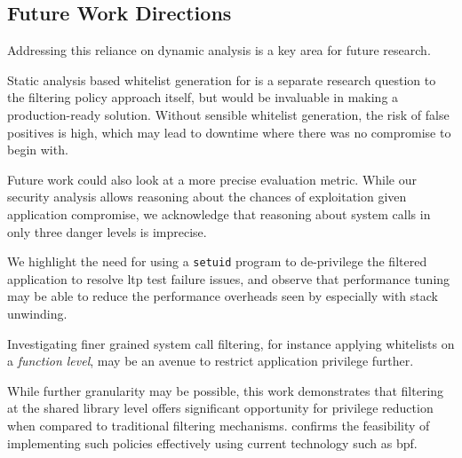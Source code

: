 \subsection{Future Work Directions}

Addressing this reliance on dynamic analysis is a key area for future research.

Static analysis based whitelist generation for \af is a separate research
question to the filtering policy approach itself, but would be invaluable in
making \af a production-ready solution. Without sensible whitelist generation,
the risk of false positives is high, which may lead to downtime where there was
no compromise to begin with.

Future work could also look at a more precise evaluation metric. While our
security analysis allows reasoning about the chances of exploitation given
application compromise, we acknowledge that reasoning about system calls in
only three danger levels is imprecise. 

We highlight the need for using a \texttt{setuid} program to de-privilege
the filtered application to resolve \ac{ltp} test failure issues, and observe
that performance tuning may be able to reduce the performance overheads seen by
\af especially with stack unwinding.

Investigating finer grained system call filtering, for instance applying
whitelists on a \textit{function level}, may be an avenue to restrict
application privilege further.

While further granularity may be possible, this work demonstrates that
filtering at the shared library level  offers significant opportunity for
privilege reduction when compared to traditional filtering mechanisms. \af
confirms the feasibility of implementing such policies effectively using
current technology such as \ac{bpf}. 
